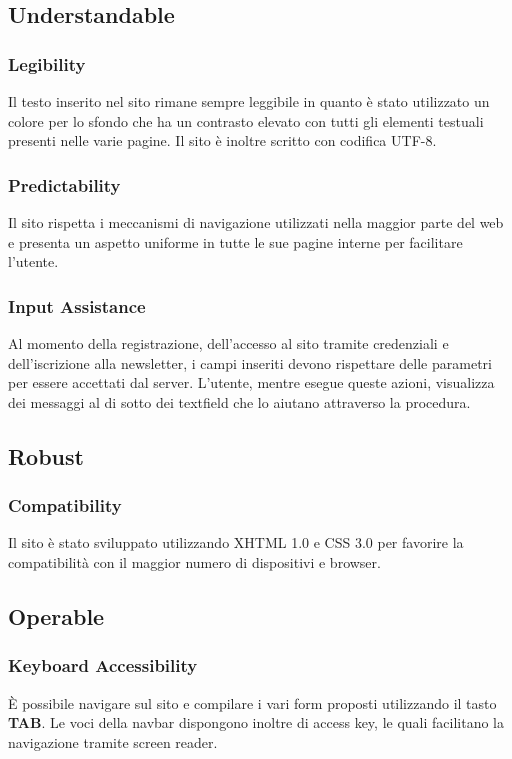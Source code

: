 \documentclass[10pt, a4paper]{article}
\begin{document}
\subsection{Understandable}

\subsubsection{Legibility}
Il testo inserito nel sito rimane sempre leggibile in quanto è stato utilizzato un colore per lo sfondo che ha un contrasto elevato con tutti gli elementi testuali presenti nelle varie pagine. Il sito è inoltre scritto con codifica UTF-8.


\subsubsection{Predictability}
Il sito rispetta i meccanismi di navigazione utilizzati nella maggior parte del web e presenta un aspetto uniforme in tutte le sue pagine interne per facilitare l'utente.


\subsubsection{Input Assistance}
Al momento della registrazione, dell’accesso al sito tramite credenziali e dell'iscrizione alla newsletter, i campi inseriti devono rispettare delle parametri per essere accettati dal server. L’utente, mentre esegue queste azioni, visualizza dei messaggi al di sotto dei textfield che lo aiutano attraverso la procedura.

\subsection{Robust}

\subsubsection{Compatibility}
Il sito è stato sviluppato utilizzando XHTML 1.0 e CSS 3.0 per favorire la compatibilità con il maggior numero di dispositivi e browser.

\subsection{Operable}

\subsubsection{Keyboard Accessibility}
È possibile navigare sul sito e compilare i vari form proposti utilizzando il tasto \textbf{TAB}. Le voci della navbar dispongono inoltre di access key, le quali facilitano la navigazione tramite screen reader.
\end{document}
